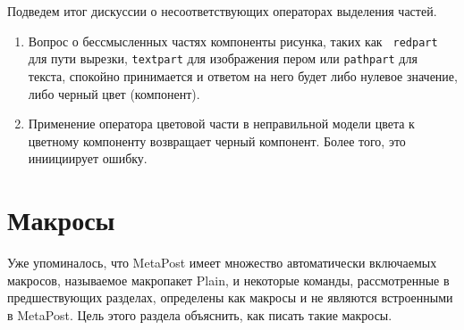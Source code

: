 \documentclass{article} %
\begin{document}
Подведем итог дискуссии о несоответствующих операторах выделения частей.
\begin{enumerate}
\item Вопрос о бессмысленных частях компоненты рисунка, таких как {\tt
  redpart} для пути вырезки, {\tt textpart} для изображения пером 
  или {\tt pathpart} для текста, спокойно принимается и 
  ответом на него будет либо нулевое значение, либо черный цвет 
  (компонент).
\item Применение оператора цветовой части в неправильной модели цвета к 
  цветному компоненту возвращает черный компонент. Более того, это иниициирует 
  ошибку.
\end{enumerate}


\section{Макросы}
\label{macros}

Уже упоминалось, что MetaPost имеет множество автоматически 
включаемых макросов, называемое макропакет Plain, и 
некоторые команды, рассмотренные в предшествующих разделах, определены 
как макросы и не являются встроенными в MetaPost.
Цель этого раздела объяснить, как писать такие макросы.
\end{document}
